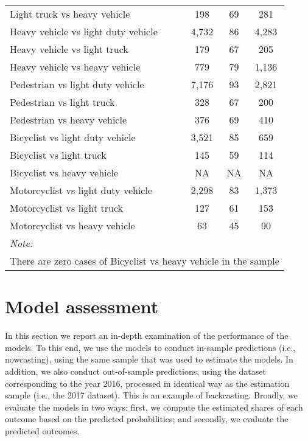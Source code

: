 \documentclass[]{elsarticle} %
\begin{document}
\begin{table}
\begin{tabular}[t]{lccc}
\hspace{1em}Light truck vs heavy vehicle & 198 & 69 & 281\\
\rowcolor{gray!6}  \hspace{1em}Heavy vehicle vs light duty vehicle & 4,732 & 86 & 4,283\\
\hspace{1em}Heavy vehicle vs light truck & 179 & 67 & 205\\
\rowcolor{gray!6}  \hspace{1em}Heavy vehicle vs heavy vehicle & 779 & 79 & 1,136\\
\hspace{1em}Pedestrian vs light duty vehicle & 7,176 & 93 & 2,821\\
\rowcolor{gray!6}  \hspace{1em}Pedestrian vs light truck & 328 & 67 & 200\\
\hspace{1em}Pedestrian vs heavy vehicle & 376 & 69 & 410\\
\rowcolor{gray!6}  \hspace{1em}Bicyclist vs light duty vehicle & 3,521 & 85 & 659\\
\hspace{1em}Bicyclist vs light truck & 145 & 59 & 114\\
\rowcolor{gray!6}  Bicyclist vs heavy vehicle & NA & NA & \vphantom{1} NA\\
\hspace{1em}Motorcyclist vs light duty vehicle & 2,298 & 83 & 1,373\\
\rowcolor{gray!6}  \hspace{1em}Motorcyclist vs light truck & 127 & 61 & 153\\
\hspace{1em}Motorcyclist vs heavy vehicle & 63 & 45 & 90\\
\bottomrule
\multicolumn{4}{l}{\textit{Note: }}\\
\multicolumn{4}{l}{There are zero cases of Bicyclist vs heavy vehicle in the sample}\\
\end{tabular}
\end{table}

\hypertarget{sec:assessment}{%
\section{Model assessment}\label{sec:assessment}}

In this section we report an in-depth examination of the performance of
the models. To this end, we use the models to conduct in-sample
predictions (i.e., nowcasting), using the same sample that was used to
estimate the models. In addition, we also conduct out-of-sample
predictions, using the dataset corresponding to the year 2016, processed
in identical way as the estimation sample (i.e., the 2017 dataset). This
is an example of backcasting. Broadly, we evaluate the models in two
ways: first, we compute the estimated shares of each outcome based on
the predicted probabilities; and secondly, we evaluate the predicted
outcomes.
\end{document}
